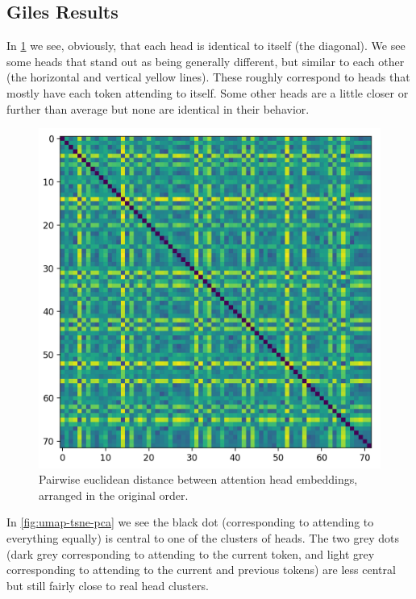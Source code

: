 \documentclass{article}
\begin{document}
\subsection{Giles Results}

In \ref{fig:head-distance-matrix} we see, obviously, that each head is identical to itself (the diagonal). We see some heads that stand out as being generally different, but similar to each other (the horizontal and vertical yellow lines). These roughly correspond to heads that mostly have each token attending to itself. Some other heads are a little closer or further than average but none are identical in their behavior.

\begin{figure}
    \includegraphics[width=\textwidth]{images/head-distance-matrix.png}
    \caption{Pairwise euclidean distance between attention head embeddings, arranged in the original order.}
    \label{fig:head-distance-matrix}
\end{figure}

In \ref{fig:umap-tsne-pca} we see the black dot (corresponding to attending to everything equally) is central to one of the clusters of heads. The two grey dots (dark grey corresponding to attending to the current token, and light grey corresponding to attending to the current and previous tokens) are less central but still fairly close to real head clusters.
\end{document}
